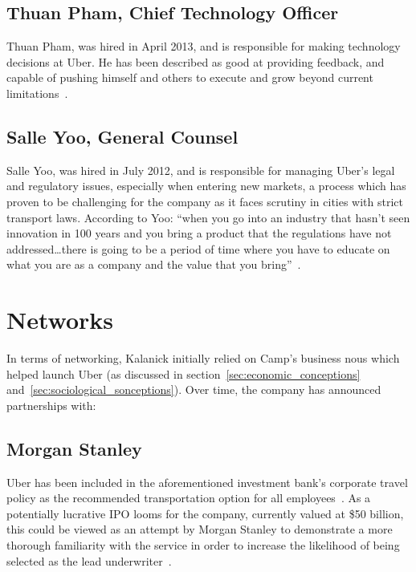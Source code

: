     \subsection{Thuan Pham, Chief Technology Officer}\label{subsec:thuan_pham}

      Thuan Pham, was hired in April 2013, and is responsible for making technology decisions at Uber. He has been described as good at providing feedback, and capable of pushing himself and others to execute and grow beyond current limitations~\parencite{keyani2015}.

    \subsection{Salle Yoo, General Counsel}\label{subsec:salle_yoo}

      Salle Yoo, was hired in July 2012, and is responsible for managing Uber's legal and regulatory issues, especially when entering new markets, a process which has proven to be challenging for the company as it faces scrutiny in cities with strict transport laws. According to Yoo: ``when you go into an industry that hasn't seen innovation in 100 years and you bring a product that the regulations have not addressed\ldots there is going to be a period of time where you have to educate on what you are as a company and the value that you bring''~\parencite{johnson2015}.

  \section{Networks}\label{sec:networks}

    In terms of networking, Kalanick initially relied on Camp's business nous which helped launch Uber (as discussed in section~\ref{sec:economic_conceptions} and~\ref{sec:sociological_sonceptions}). Over time, the company has announced partnerships with:

    \subsection{Morgan Stanley}\label{subsec:morgan_stanley}

      Uber has been included in the aforementioned investment bank's corporate travel policy as the recommended transportation option for all employees~\parencite{uber2014b}. As a potentially lucrative IPO looms for the company, currently valued at \$50 billion, this could be viewed as an attempt by Morgan Stanley to demonstrate a more thorough familiarity with the service in order to increase the likelihood of being selected as the lead underwriter~\parencite{popper2015}.

